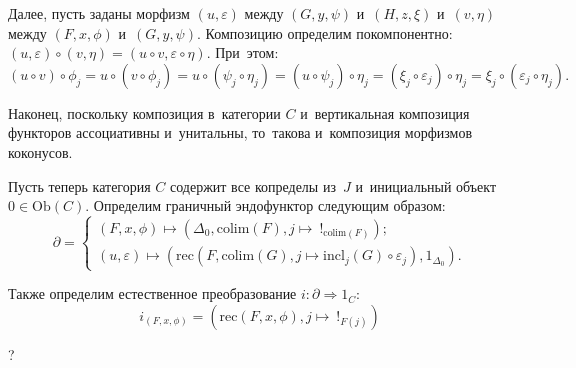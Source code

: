 \documentclass{article}
\begin{document}
Далее, пусть заданы морфизм $(u, \varepsilon)$ между $(G, y, \psi)$ и~$(H, z, \xi)$ и~$(v, \eta)$ между $(F, x, \phi)$ и~$(G, y, \psi)$.
Композицию определим покомпонентно: $(u, \varepsilon) \circ (v, \eta) = (u \circ v, \varepsilon \circ \eta)$.
При~этом:
$$
    (u \circ v) \circ \phi_j = u \circ (v \circ \phi_j)
                             = u \circ (\psi_j \circ \eta_j)
                             = (u \circ \psi_j) \circ \eta_j
                             = (\xi_j \circ \varepsilon_j) \circ \eta_j
                             = \xi_j \circ (\varepsilon_j \circ \eta_j).
$$

Наконец, поскольку композиция в~категории $C$ и~вертикальная композиция функторов ассоциативны
и~унитальны, то~такова и~композиция морфизмов коконусов.

Пусть теперь категория $C$ содержит все копределы из~$J$ и~инициальный объект $0 \in \mathrm{Ob}(C)$.
Определим граничный эндофунктор следующим образом:
$$
\partial = \begin{cases}
             (F, x, \phi) \mapsto (\Delta_0, \mathrm{colim}(F), j \mapsto\ !_{\mathrm{colim}(F)}); \\
             (u, \varepsilon) \mapsto (\mathrm{rec}(F, \mathrm{colim}(G), j \mapsto \mathrm{incl}_j(G) \circ \varepsilon_j), 1_{\Delta_0}).
           \end{cases}
$$

Также определим естественное преобразование $i : \partial \Rightarrow 1_C$:
$$
    i_{(F, x, \phi)} = (\mathrm{rec}(F, x, \phi), j \mapsto\ !_{F(j)})
$$

?

\pagebreak
\end{document}

